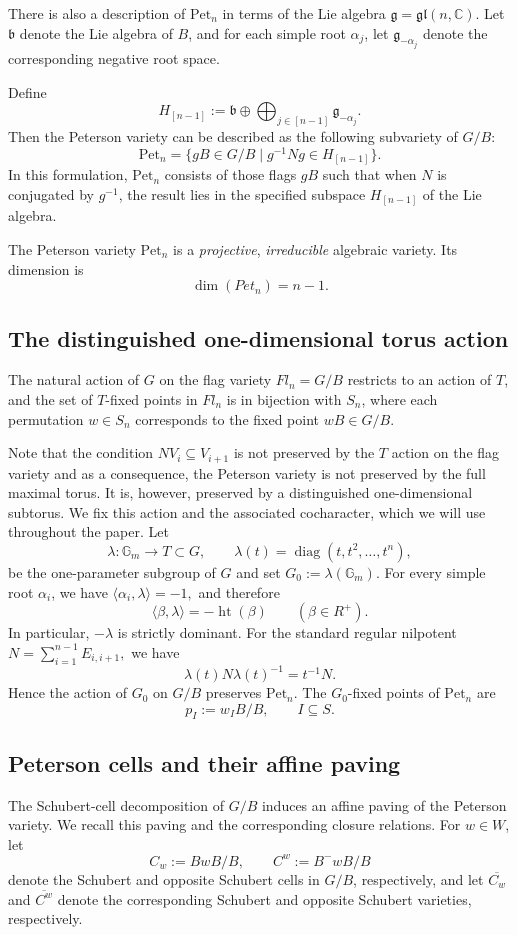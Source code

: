 \documentclass[12pt, reqno]{amsart}
\theoremstyle{plain}
\numberwithin{equation}{section}
\newcommand{\diag}{\operatorname{diag}}
\theoremstyle{definition}
\begin{document}
There is also a description of $\mathrm{Pet}_n$ in terms of the Lie algebra $\mathfrak{g} = \mathfrak{gl}(n,\mathbb{C})$.  
Let $\mathfrak{b}$ denote the Lie algebra of $B$, and for each simple root $\alpha_j$, let $\mathfrak{g}_{-\alpha_j}$ denote the corresponding negative root space.

Define
$$
H_{[n-1]} := \mathfrak{b} \oplus \bigoplus_{j \in [n-1]} \mathfrak{g}_{-\alpha_j}.
$$
Then the Peterson variety can be described as the following subvariety of $G / B$:
$$
\mathrm{Pet}_n = \{ gB \in G/B \mid g^{-1} N g \in H_{[n-1]} \}.
$$
In this formulation, $\mathrm{Pet}_n$ consists of those flags $gB$ such that when $N$ is conjugated by $g^{-1}$, the result lies in the specified subspace $H_{[n-1]}$ of the Lie algebra.

The Peterson variety $\mathrm{Pet}_n$ is a \emph{projective}, \emph{irreducible} algebraic variety.  
Its dimension is
$$
\dim(Pet_n) = n - 1.
$$

\subsection{The distinguished one-dimensional torus action}
The natural action of $G$ on the flag variety $Fl_n=G/B$ restricts to an action of $T$, and the set of $T$-fixed points in $Fl_n$ is in bijection with $S_n$, where each permutation $w \in S_n$ corresponds to the fixed point $wB \in G/B$.

Note that the condition $NV_i \subseteq V_{i+1}$ is not preserved by the $T$ action on the flag variety and as a consequence, the Peterson variety is not preserved by the full maximal torus.
It is, however, preserved by a distinguished one-dimensional subtorus.  We fix this action and the
associated cocharacter, which we will use throughout the paper. Let \[ \lambda:\mathbb G_m\longrightarrow T \subset G, \qquad \lambda(t)=\diag(t,t^2,\ldots,t^n), \] be the one-parameter subgroup of $G$ and set $G_0:=\lambda(\mathbb G_m).$ For every simple root $\alpha_i$, we have $\langle\alpha_i,\lambda\rangle=-1,$ and therefore \[ \langle\beta,\lambda\rangle=-\operatorname{ht}(\beta) \qquad(\beta\in R^+). \] In particular, \(-\lambda\) is strictly dominant. For the standard regular nilpotent $N=\sum_{i=1}^{n-1}E_{i,i+1},$ we have \[ \lambda(t)N\lambda(t)^{-1}=t^{-1}N. \] Hence the action of \(G_0\) on \(G/B\) preserves $\mathrm{Pet}_n.$ The \(G_0\)-fixed points of \(\mathrm{Pet}_n\) are \[ p_I:=w_IB/B, \qquad I\subseteq S. \] 

\subsection{Peterson cells and their affine paving}\label{affine-paving} The Schubert-cell decomposition of \(G/B\) induces an affine paving of
the Peterson variety. We recall this paving and the corresponding
closure relations.
For \(w\in W\), let
\[
C_w:=BwB/B,
\qquad
C^w:=B^-wB/B
\]
denote the Schubert and opposite Schubert cells in \(G/B\), respectively,
and let $\overline{C_w}$ and 
$\overline{C^w}$
denote the corresponding Schubert and opposite Schubert varieties, respectively. 
\end{document}
